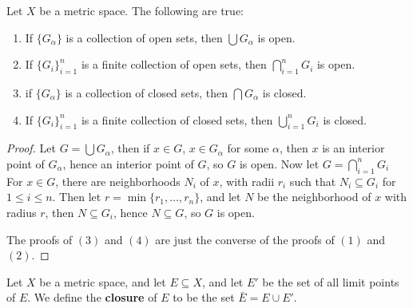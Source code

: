 \begin{theorem}\label{2.2.6}
    Let $X$ be a metric space. The following are true:
        \begin{enumerate}[label=(\arabic*)]
            \item If $\{G_{\alpha}\}$ is a collection of  open sets, then $\bigcup{G_{\alpha}}$ is open.

            \item If $\{G_i\}_{i=1}^n$ is a finite collection of open sets, then  $\bigcap_{i=1}^{n}{G_i}$ is open.

            \item if $\{G_{\alpha}\}$ is a collection of  closed sets, then $\bigcap{G_{\alpha}}$ is closed.

            \item If $\{G_i\}_{i=1}^n$ is a finite collection of closed sets, then  $\bigcup_{i=1}^{n}{G_i}$ is closed.
        \end{enumerate}
\end{theorem}
\begin{proof}
    Let $G=\bigcup{G_{\alpha}}$, then if $x \in G$,  $x \in G_{\alpha}$ for some $\alpha$, then 
    $x$ is an interior point of  $G_{\alpha}$, hence an interior point of  $G$, so  $G$ is open. 
    Now let  $G=\bigcap_{i=1}^{n}{G_i}$ For  $x \in G$, there are neighborhoods  $N_i$ of  $x$, with 
    radii  $r_i$ such that  $N_i \subseteq G_i$ for  $1 \leq i \leq n$. Then let  $r=\min\{r_1, \dots, r_n\}$, 
    and let $N$ be the neighborhood of  $x$ with radius  $r$, then  $N \subseteq G_i$, 
    hence  $N \subseteq G$, so  $G$ is open.

    The proofs of  $(3)$ and  $(4)$ are just the converse of the proofs of  $(1)$ and  $(2)$.
\end{proof}

\begin{definition}
    Let $X$ be a metric space, and let  $E \subseteq X$, and let  $E'$ be the set of all 
    limit points of $E$. We define the \textbf{closure} of $E$ to be the set $\bar{E}=E \cup E'$.
\end{definition}


